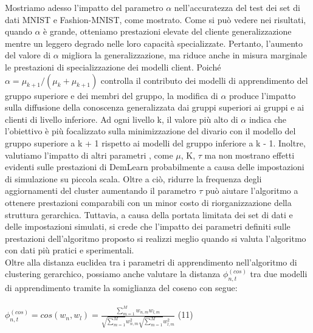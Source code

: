 Mostriamo adesso l'impatto del parametro $\alpha$ nell'accuratezza del test dei set di dati MNIST e Fashion-MNIST, come mostrato. Come si può vedere nei risultati, quando $\alpha$ è grande, otteniamo prestazioni elevate del cliente generalizzazione mentre un leggero degrado nelle loro capacità specializzate.
Pertanto, l'aumento del valore di $\alpha$ migliora la generalizzazione, ma riduce anche in misura marginale le prestazioni di specializzazione dei modelli client. Poiché $\alpha=\mu_{k+1}/(\mu_k+\mu_{k+1})$ controlla il contributo dei modelli di apprendimento del gruppo superiore e dei membri del gruppo, la modifica di $\alpha$ produce l'impatto sulla diffusione della conoscenza generalizzata dai gruppi superiori ai gruppi e ai clienti di livello inferiore. Ad ogni livello k, il valore più alto di $\alpha$ indica che l'obiettivo è più focalizzato sulla minimizzazione del divario con il modello del gruppo superiore a k + 1 rispetto ai modelli del gruppo inferiore a k - 1. Inoltre, valutiamo l'impatto di altri parametri , come $\mu$, K, $\tau$ ma non mostrano effetti evidenti sulle prestazioni di DemLearn probabilmente a causa delle impostazioni di simulazione su piccola scala. Oltre a ciò, ridurre la frequenza degli aggiornamenti del cluster aumentando il parametro $\tau$ può aiutare l'algoritmo a ottenere prestazioni comparabili con un minor costo di riorganizzazione della struttura gerarchica. Tuttavia, a causa della portata limitata dei set di dati e delle impostazioni simulati, si crede che l'impatto dei parametri definiti sulle prestazioni dell'algoritmo proposto si realizzi meglio quando si valuta l'algoritmo con dati più pratici e sperimentali.\\
Oltre alla distanza euclidea tra i parametri di apprendimento nell'algoritmo di clustering gerarchico, possiamo anche valutare la distanza $\phi_{n,t}^{(cos)}$ tra due modelli di apprendimento tramite la somiglianza del coseno con segue:\\
\\ $\phi_{n,t}^{(cos)}=cos(w_n,w_l)=\frac{\sum_{m=1}^M w_{n,m}w_{l,m}}{\sqrt{\sum_{m=1}^M}w_{n,m}^2\sqrt{\sum_{m=1}^M}w_{l,m}^2}$ \hspace{1cm} (11)\\
